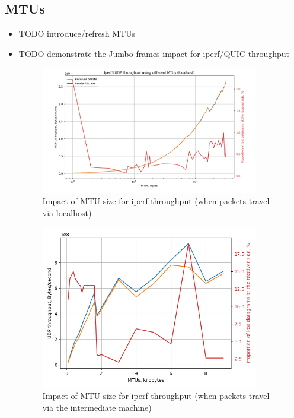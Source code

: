 \documentclass[12pt,a4paper,twoside,openright]{report}
\begin{document}
\subsection{MTUs}
\begin{itemize}
  \item TODO introduce/refresh MTUs
  \item TODO demonstrate the Jumbo frames impact for iperf/QUIC throughput
  
  
  
    \begin{figure}[H]
    \centering
    \includegraphics[width=0.9\textwidth]{figs/Iperf3 UDP throughput using different MTUs (localhost).png}
    \caption{Impact of MTU size for iperf throughput (when packets travel via localhost)}
    \label{fig:MTU_impact_for_localhost_iperf_throughput}
    \end{figure}
    
    \begin{figure}[H]
    \centering
    \includegraphics[width=0.9\textwidth]{figs/Iperf3 UDP throughput using different MTUs (A1-to-B-to-A2).png}
    \caption{Impact of MTU size for iperf throughput (when packets travel via the intermediate machine)}
    \label{fig:}
    \end{figure}
  

\end{itemize}
\end{document}
